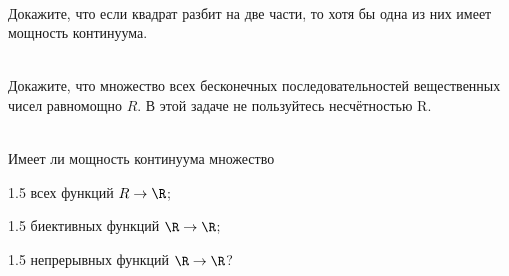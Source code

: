 \documentclass[a4paper,12pt,twoside]{article}
\begin{document}
\begin{?}\ \\
     Докажите, что если квадрат разбит на две части, то хотя бы одна из них имеет мощность континуума.
\end{?}
\begin{?}\ \\
     Докажите, что множество всех бесконечных последовательностей вещественных чисел равномощно $R$. В этой задаче не пользуйтесь несчётностью R.
\end{?}
\begin{?}\ \\
    Имеет ли мощность континуума множество
    \begin{tasklist}
        \item[1.5] всех функций $R \to \R$;
        \item[1.5] биективных функций $\R \to \R$;
        \item[1.5] непрерывных функций $\R \to \R$?
    \end{tasklist}
\end{?}
\end{document}
